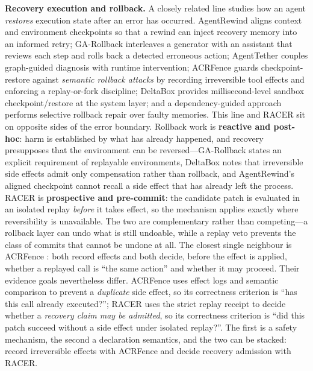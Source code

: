 \documentclass[review]{fcs}
\begin{document}
\textbf{Recovery execution and rollback.} A closely related line studies how an agent \emph{restores} execution state after an error has occurred. AgentRewind \cite{ref8} aligns context and environment checkpoints so that a rewind can inject recovery memory into an informed retry; GA-Rollback \cite{ref9} interleaves a generator with an assistant that reviews each step and rolls back a detected erroneous action; AgentTether \cite{ref10} couples graph-guided diagnosis with runtime intervention; ACRFence \cite{ref11} guards checkpoint-restore against \emph{semantic rollback attacks} by recording irreversible tool effects and enforcing a replay-or-fork discipline; DeltaBox \cite{ref12} provides millisecond-level sandbox checkpoint/restore at the system layer; and a dependency-guided approach \cite{ref13} performs selective rollback repair over faulty memories. This line and RACER sit on opposite sides of the error boundary. Rollback work is \textbf{reactive and post-hoc}: harm is established by what has already happened, and recovery presupposes that the environment can be reversed---GA-Rollback states an explicit requirement of replayable environments, DeltaBox notes that irreversible side effects admit only compensation rather than rollback, and AgentRewind's aligned checkpoint cannot recall a side effect that has already left the process. RACER is \textbf{prospective and pre-commit}: the candidate patch is evaluated in an isolated replay \emph{before} it takes effect, so the mechanism applies exactly where reversibility is unavailable. The two are complementary rather than competing---a rollback layer can undo what is still undoable, while a replay veto prevents the class of commits that cannot be undone at all. The closest single neighbour is ACRFence \cite{ref11}: both record effects and both decide, before the effect is applied, whether a replayed call is ``the same action'' and whether it may proceed. Their evidence goals nevertheless differ. ACRFence uses effect logs and semantic comparison to prevent a \emph{duplicate} side effect, so its correctness criterion is ``has this call already executed?''; RACER uses the strict replay receipt to decide whether a \emph{recovery claim may be admitted}, so its correctness criterion is ``did this patch succeed without a side effect under isolated replay?''. The first is a safety mechanism, the second a declaration semantics, and the two can be stacked: record irreversible effects with ACRFence and decide recovery admission with RACER.
\end{document}
